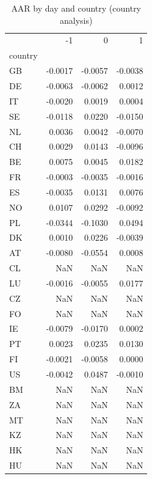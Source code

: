 \begin{table}
\caption{AAR by day and country (country analysis)}
\label{tab:country_aar}
\begin{tabular}{lrrr}
\toprule
 & -1 & 0 & 1 \\
country &  &  &  \\
\midrule
GB & -0.0017 & -0.0057 & -0.0038 \\
DE & -0.0063 & -0.0062 & 0.0012 \\
IT & -0.0020 & 0.0019 & 0.0004 \\
SE & -0.0118 & 0.0220 & -0.0150 \\
NL & 0.0036 & 0.0042 & -0.0070 \\
CH & 0.0029 & 0.0143 & -0.0096 \\
BE & 0.0075 & 0.0045 & 0.0182 \\
FR & -0.0003 & -0.0035 & -0.0016 \\
ES & -0.0035 & 0.0131 & 0.0076 \\
NO & 0.0107 & 0.0292 & -0.0092 \\
PL & -0.0344 & -0.1030 & 0.0494 \\
DK & 0.0010 & 0.0226 & -0.0039 \\
AT & -0.0080 & -0.0554 & 0.0008 \\
CL & NaN & NaN & NaN \\
LU & -0.0016 & -0.0055 & 0.0177 \\
CZ & NaN & NaN & NaN \\
FO & NaN & NaN & NaN \\
IE & -0.0079 & -0.0170 & 0.0002 \\
PT & 0.0023 & 0.0235 & 0.0130 \\
FI & -0.0021 & -0.0058 & 0.0000 \\
US & -0.0042 & 0.0487 & -0.0010 \\
BM & NaN & NaN & NaN \\
ZA & NaN & NaN & NaN \\
MT & NaN & NaN & NaN \\
KZ & NaN & NaN & NaN \\
HK & NaN & NaN & NaN \\
HU & NaN & NaN & NaN \\
\bottomrule
\end{tabular}
\end{table}
